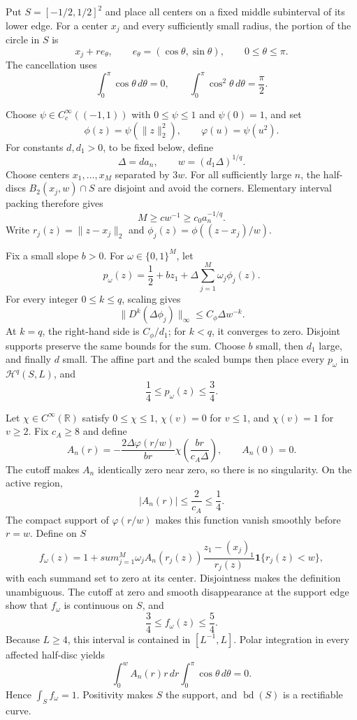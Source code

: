 Put \(S=[-1/2,1/2]^2\) and place all centers on a fixed middle subinterval of its lower edge.  For a center \(x_j\) and every sufficiently small radius, the portion of the circle in \(S\) is
\[
 x_j+r e_\theta,
 \qquad e_\theta=(\cos\theta,\sin\theta),
 \qquad 0\leq\theta\leq\pi.
\]
The cancellation uses
\[
 \int_0^\pi\cos\theta\,d\theta=0,
 \qquad
 \int_0^\pi\cos^2\theta\,d\theta=\frac\pi2.
\]

Choose \(\psi\in C_c^\infty((-1,1))\) with \(0\leq\psi\leq1\) and \(\psi(0)=1\), and set
\[
 \phi(z)=\psi(\lVert z\rVert_2^2),
 \qquad
 \varphi(u)=\psi(u^2).
\]
For constants \(d,d_1>0\), to be fixed below, define
\[
 \Delta=d a_n,
 \qquad
 w=(d_1\Delta)^{1/q}.
\]
Choose centers \(x_1,\ldots,x_M\) separated by \(3w\).  For all sufficiently large \(n\), the half-discs \(B_2(x_j,w)\cap S\) are disjoint and avoid the corners.  Elementary interval packing therefore gives
\[
 M\geq c w^{-1}\geq c_0a_n^{-1/q}.
\]
Write \(r_j(z)=\lVert z-x_j\rVert_2\) and \(\phi_j(z)=\phi((z-x_j)/w)\).

Fix a small slope \(b>0\).  For \(\omega\in\{0,1\}^M\), let
\[
 p_\omega(z)=\frac12+bz_1+\Delta\sum_{j=1}^M\omega_j\phi_j(z).
\]
For every integer \(0\leq k\leq q\), scaling gives
\[
 \lVert D^k(\Delta\phi_j)\rVert_\infty
 \leq C_\phi\Delta w^{-k}.
\]
At \(k=q\), the right-hand side is \(C_\phi/d_1\); for \(k<q\), it converges to zero.  Disjoint supports preserve the same bounds for the sum.  Choose \(b\) small, then \(d_1\) large, and finally \(d\) small.  The affine part and the scaled bumps then place every \(p_\omega\) in \(\mathcal H^q(S,L)\), and
\[
 \frac14\leq p_\omega(z)\leq\frac34.
\]

Let \(\chi\in C^\infty(\mathbb R)\) satisfy \(0\leq\chi\leq1\), \(\chi(v)=0\) for \(v\leq1\), and \(\chi(v)=1\) for \(v\geq2\).  Fix \(c_A\geq8\) and define
\[
 A_n(r)=-\frac{2\Delta\varphi(r/w)}{br}
 \chi\!\left(\frac{br}{c_A\Delta}\right),
 \qquad A_n(0)=0.
\]
The cutoff makes \(A_n\) identically zero near zero, so there is no singularity.  On the active region,
\[
 |A_n(r)|\leq\frac2{c_A}\leq\frac14.
\]
The compact support of \(\varphi(r/w)\) makes this function vanish smoothly before \(r=w\).  Define on \(S\)
\[
 f_\omega(z)=1+sum_{j=1}^M\omega_j A_n(r_j(z))
 \frac{z_1-(x_j)_1}{r_j(z)}\mathbf1\{r_j(z)<w\},
\]
with each summand set to zero at its center.  Disjointness makes the definition unambiguous.  The cutoff at zero and smooth disappearance at the support edge show that \(f_\omega\) is continuous on \(S\), and
\[
 \frac34\leq f_\omega(z)\leq\frac54.
\]
Because \(L\geq4\), this interval is contained in \([L^{-1},L]\).  Polar integration in every affected half-disc yields
\[
 \int_0^w A_n(r)r\,dr\int_0^\pi\cos\theta\,d\theta=0.
\]
Hence \(\int_Sf_\omega=1\).  Positivity makes \(S\) the support, and \(\operatorname{bd}(S)\) is a rectifiable curve.

